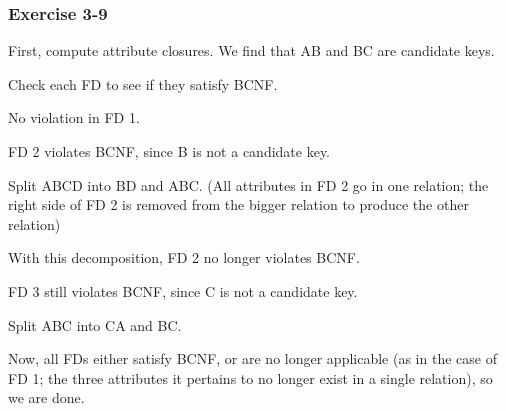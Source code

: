 \begin{frame}
\frametitle{Exercise 3-9}

First, compute attribute closures. We find that AB and BC are candidate keys.

Check each FD to see if they satisfy BCNF.

No violation in FD 1.

FD 2 violates BCNF, since B is not a candidate key.

Split ABCD into BD and ABC. (All attributes in FD 2 go in one relation; the right side of FD 2 is removed from the bigger relation to produce the other relation)

With this decomposition, FD 2 no longer violates BCNF.

FD 3 still violates BCNF, since C is not a candidate key.

Split ABC into CA and BC.

Now, all FDs either satisfy BCNF, or are no longer applicable (as in the case of FD 1; the three attributes it pertains to no longer exist in a single relation), so we are done.

\end{frame}

